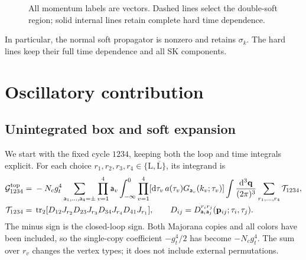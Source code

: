 \documentclass[a4paper,12pt]{article}
\newcommand{\mb}{\mathbf}
\def\aa{\mathsf a}
\newcommand{\di}{\mathrm d}
\newcommand{\tr}{\operatorname{tr}}
\newcommand{\bq}{\mb q}
\newcommand{\bk}{\mb k}
\newcommand{\G}{\mathcal G}
\begin{document}
\begin{figure}[htbp]
\centering
{}
\caption{All momentum labels are vectors.
Dashed lines select the double-soft region; solid internal lines retain
complete hard time dependence. }
\end{figure}

In particular, the normal soft propagator is nonzero and retains
$\sigma_k$. The hard lines keep their full time dependence and all SK
components.

\section{Oscillatory contribution}
\subsection{Unintegrated box and soft expansion}
\label{sec:collapsed}
We start with the fixed cycle $1234$, keeping both the loop and time
integrals explicit. For each choice
$r_1,r_2,r_3,r_4\in\{\mathrm L,\overline{\mathrm L}\}$, its integrand is
\begin{align}
 \G^{\rm top}_{1234}
 ={}&-N_cg_t^4
 \sum_{\aa_1,\ldots,\aa_4=\pm}\prod_{v=1}^4\aa_v
 \int_{-\infty}^0\prod_{v=1}^4
 [\di\tau_v\,a(\tau_v)G_{\aa_v}(k_v;\tau_v)]
 \int\frac{\di^3\bq}{(2\pi)^3}
 \sum_{r_1,\ldots,r_4}
 \mathcal T_{1234},\nonumber\\
 \mathcal T_{1234}
 ={}&\tr_2[D_{12}J_{r_2}D_{23}J_{r_3}
              D_{34}J_{r_4}D_{41}J_{r_1}],
 \qquad
 D_{ij}=D^{r_i r_j}_{\aa_i \aa_j}(\mb p_{ij};\tau_i,\tau_j).
 \label{eq:unintegrated-box}
\end{align}
The minus sign is the closed-loop sign. Both Majorana copies and all
colors have been included, so the single-copy coefficient $-g_t^4/2$
has become $-N_cg_t^4$. The sum over $r_v$ changes the vertex types;
it does not include external permutations.
\end{document}
